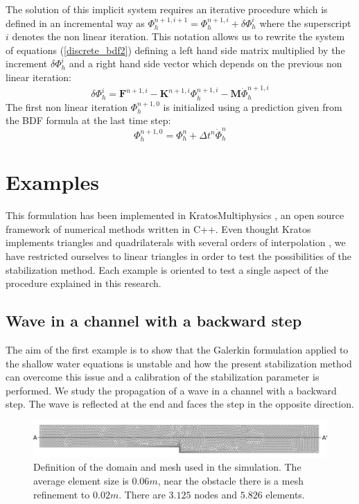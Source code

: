 \documentclass[a4paper,12pt]{article}
\begin{document}
The solution of this implicit system requires an iterative procedure which is defined in an incremental way as
$\Phi_h^{n+1,i+1} = \Phi_h^{n+1,i} + \delta\Phi_h^i$
where the superscript $i$ denotes the non linear iteration. This notation allows us to rewrite the system of equations (\ref{discrete_bdf2}) defining a left hand side matrix multiplied by the increment $\delta\Phi_h^i$ and a right hand side vector which depends on the previous non linear iteration:
\begin{equation}
[\beta_0\mathbf{M} + \mathbf{K}^{n+1}] \delta\Phi_h^i
= \mathbf{F}^{n+1,i} - \mathbf{K}^{n+1,i}\Phi_h^{n+1,i} - \mathbf{M}\dot{\Phi}_h^{n+1,i}
\end{equation}
The first non linear iteration $\Phi_h^{n+1,0}$ is initialized using a prediction given from the BDF formula at the last time step:
\begin{equation}
\Phi_h^{n+1,0} = \Phi_h^n + \Delta t^n \dot{\Phi}_h^{n}
\end{equation}


\section{Examples} \label{sec:examples}

This formulation has been implemented in KratosMultiphysics \cite{dadvand2010, dadvand2013}, an open source framework of numerical methods written in C++. Even thought Kratos implements triangles and quadrilaterals with several orders of interpolation \cite{kratos2020}, we have restricted ourselves to linear triangles in order to test the possibilities of the stabilization method. Each example is oriented to test a single aspect of the procedure explained in this research.

\subsection{Wave in a channel with a backward step}

The aim of the first example is to show that the Galerkin formulation applied to the shallow water equations is unstable and how the present stabilization method can overcome this issue and a calibration of the stabilization parameter is performed.
We study the propagation of a wave in a channel with a backward step. The wave is reflected at the end and faces the step in the opposite direction. 

\begin{figure}
    \includegraphics[width=\textwidth]{img/step/mesh.pdf}
    \caption{Definition of the domain and mesh used in the simulation. The average element size is $0.06m$, near the obstacle there is a mesh refinement to $0.02m$. There are $3.125$ nodes and $5.826$ elements.}
    \label{step_mesh}
\end{figure}
\end{document}
